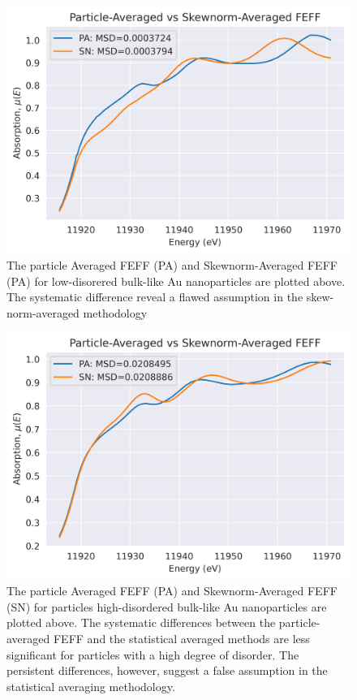 \begin{figure}[!h]
	\centering
	
	\includegraphics[width=.75\linewidth]{Chapters/Figures/PA-vs-skewnorm-newvals.png}
	\caption[Particle-Averaged vs. Skewnorm-Averaged FEFF Low-Disorder]{The particle Averaged FEFF (PA) and Skewnorm-Averaged FEFF (PA) for low-disorered bulk-like Au nanoparticles are plotted above. The systematic difference reveal a flawed assumption in the skew-norm-averaged methodology}
	\label{fig:pa-vs-sknm-feff}
\end{figure}

\begin{figure}[!h]
	\centering
	
	\includegraphics[width=.75\linewidth]{Chapters/Figures/PA-vs-skewnorm-newvals-large-msd.png}
	\caption[Particle-Averaged vs. Skewnorm-Averaged FEFF High-Disorder]{The particle Averaged FEFF (PA) and Skewnorm-Averaged FEFF (SN) for particles high-disordered bulk-like Au nanoparticles are plotted above. The systematic differences between the particle-averaged FEFF and the statistical averaged methods are less significant for particles with a high degree of disorder. The persistent differences, however, suggest a false assumption in the statistical averaging methodology.}
	\label{fig:pa-vs-sknm-feff-bigmsd}
\end{figure}


